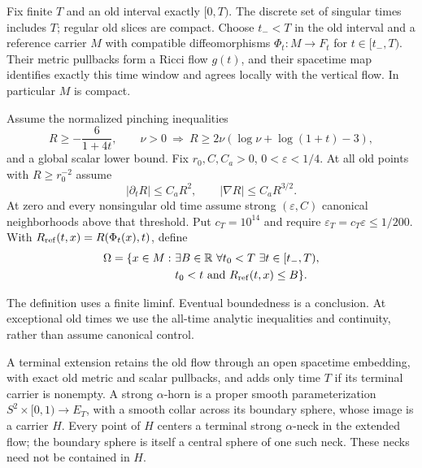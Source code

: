 Fix finite $T$ and an old interval exactly $[0,T)$. The discrete set of
singular times includes $T$; regular old slices are compact. Choose
$t_-<T$ in the old interval and a reference carrier $M$ with compatible
diffeomorphisms $\Phi_t:M\to F_t$ for $t\in[t_-,T)$. Their metric
pullbacks form a Ricci flow $g(t)$, and their spacetime map identifies
exactly this time window and agrees locally with the vertical flow.
In particular $M$ is compact.

\begin{definition}
\label{def:singular-retained-region}
Assume the normalized pinching inequalities
\[
 R\geq-\frac6{1+4t},\qquad
 \nu>0\ \Longrightarrow\ R\geq2\nu(\log\nu+\log(1+t)-3),
\]
and a global scalar lower bound. Fix $r_0,C,C_a>0$, $0<\varepsilon<1/4$.
At all old points with $R\geq r_0^{-2}$ assume
\begin{equation}
 |\partial_tR|\leq C_aR^2,\qquad |\nabla R|\leq C_aR^{3/2}.
 \label{eq:singular-analytic-bounds}
\end{equation}
At zero and every nonsingular old time assume strong
$(\varepsilon,C)$ canonical neighborhoods above that threshold.
Put $c_T=10^{14}$ and require $\varepsilon_T=c_T\varepsilon\leq1/200$.
With $R_{\rm ref}(t,x)=R(\Phi_t(x),t)$, define
\begin{equation}
 \begin{split}
 \Omega=\{x\in M:\ &\exists B\in\mathbb R\ \forall t_0<T\
 \exists t\in[t_-,T),\\
 &t_0<t\text{ and }R_{\rm ref}(t,x)\leq B\}.
 \end{split}
 \label{eq:singular-retained-region}
\end{equation}
\end{definition}

The definition uses a finite liminf. Eventual boundedness is a conclusion.
At exceptional old times we use the all-time analytic inequalities and
continuity, rather than assume canonical control.

\begin{definition}
\label{def:singular-terminal-horn}
A terminal extension retains the old flow through an open spacetime
embedding, with exact old metric and scalar pullbacks, and adds only time
$T$ if its terminal carrier is nonempty. A strong $\alpha$-horn is a
proper smooth parameterization $S^2\times[0,1)\to E_T$, with a smooth
collar across its boundary sphere, whose image is a carrier $H$.
Every point of $H$ centers a terminal strong $\alpha$-neck in the extended
flow; the boundary sphere is itself a central sphere of one such neck.
These necks need not be contained in $H$.
\end{definition}

